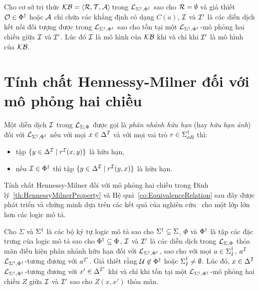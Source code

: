 \begin{Corollary}
\label{co:KnowledgeBaseInvariant}
	Cho cơ sở tri thức $\mathcal{KB} = \left\langle\mathcal{R}, \mathcal{T}, \mathcal{A}\right\rangle\!$ trong $\mathcal{L}_{\Sigma^\dag,\Phi^\dag}$ sao cho $\mathcal{R} = \emptyset$ và giả thiết $\mathcal{O} \in \Phi^\dag$ hoặc $\mathcal{A}$ chỉ chứa các khẳng định có dạng $C(a)$, $\mathcal{I}$ và $\mathcal{I}'$ là các diễn dịch kết nối đối tượng được trong $\mathcal{L}_{\Sigma^\dag,\Phi^\dag}$ sao cho tồn tại một $\mathcal{L}_{\Sigma^\dag,\Phi^\dag}$-mô phỏng hai chiều giữa $\mathcal{I}$ và $\mathcal{I}'$. Lúc đó $\mathcal{I}$ là mô hình của $\mathcal{KB}$ khi và chỉ khi $\mathcal{I}'$ là mô hình của $\mathcal{KB}$.
\end{Corollary}

\section{Tính chất Hennessy-Milner đối với mô phỏng hai chiều}

\begin{Definition}
\label{def:FiniteImage}
	Một diễn dịch $\mathcal{I}$ trong $\mathcal{L}_{\Sigma,\Phi}$ được gọi là {\em phân nhánh hữu hạn} (hay {\em hữu hạn ảnh}) đối với $\mathcal{L}_{\Sigma^\dag,\Phi^\dag}$ nếu với mọi $x \in \Delta^{\mathcal{I}}$ và với mọi vai trò $r \in \Sigma^\dag_{oR}$ thì:
	\begin{itemize}
		\item tập $\{y \in \Delta^{\mathcal{I}} \mid r^{\mathcal{I}}(x,y)\}$ là hữu hạn,
		
		\item nếu $\mathcal{I} \in \Phi^\dag$ thì tập $\{y \in \Delta^{\mathcal{I}} \mid r^{\mathcal{I}}(y, x)\}$ là hữu hạn.\myend
	\end{itemize}
\end{Definition}

Tính chất Hennessy-Milner đối với mô phỏng hai chiều trong Đinh lý~\ref{th:HennessyMilnerProperty} và Hệ quả~\ref{co:EquivalenceRelation} sau đây được phát triển và chứng minh dựa trên các kết quả của nghiên cứu~\cite{Divroodi2011B} cho một lớp lớn hơn các logic mô tả.

\begin{Theorem}
\label{th:HennessyMilnerProperty}
	Cho $\Sigma$ và $\Sigma^\dag$ là các bộ ký tự logic mô tả sao cho $\Sigma^\dag \subseteq \Sigma$, $\Phi$ và $\Phi^\dag$ là tập các đặc trưng của logic mô tả sao cho $\Phi^\dag \subseteq \Phi$, $\mathcal{I}$ và $\mathcal{I}'$ là các diễn dịch trong $\mathcal{L}_{\Sigma,\Phi}$ thỏa mãn điều kiện phân nhánh hữu hạn đối với $\mathcal{L}_{\Sigma^\dag,\Phi^\dag}$, sao cho với mọi $a \in \Sigma^\dag_I$, $a^{\mathcal{I}}$ $\mathcal{L}_{\Sigma^\dag,\Phi^\dag}$-tương đương với $a^{\mathcal{I}'}$. Giả thiết rằng $\mathcal{U} \not \in \Phi^\dag$ hoặc $\Sigma^\dag_I \not= \emptyset$. Lúc đó, $x \in \Delta^{\mathcal{I}}$ $\mathcal{L}_{\Sigma^\dag,\Phi^\dag}$-tương đương với $x' \in \Delta^{\mathcal{I}'}$ khi và chỉ khi tồn tại một $\mathcal{L}_{\Sigma^\dag,\Phi^\dag}$-mô phỏng hai chiều $Z$ giữa $\mathcal{I}$ và $\mathcal{I}'$ sao cho $Z(x, x')$ thỏa mãn.
\end{Theorem}

